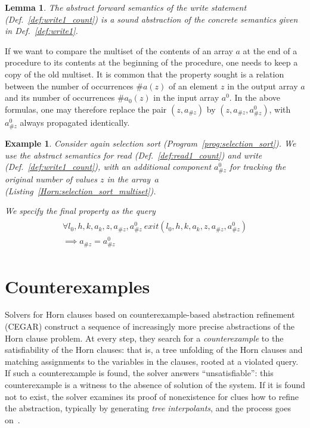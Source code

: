 \documentclass[a4paper]{article}
\newcommand{\hash}{\#}
\theoremstyle{definition}
\theoremstyle{plain}
\newtheorem{lemma}[theorem]{Lemma}
\newtheorem{example}{Example}
\begin{document}
\begin{lemma}
The abstract forward semantics of the write statement (Def.~\ref{def:write1_count}) is a sound abstraction of the concrete semantics given in Def.~\ref{def:write1}.
\end{lemma}

If we want to compare the multiset of the contents of an array $a$ at the end of a procedure to its contents at the beginning of the procedure, one needs to keep a copy of the old multiset.
It is common that the property sought is a relation between the number of occurrences $\hash a(z)$ of an element $z$ in the output array $a$ and its number of occurrences $\hash a_0(z)$ in the input array $a^0$. In the above formulas, one may therefore replace the pair $(z, a_{\hash z})$ by $(z, a_{\hash z}, a^0_{\hash z})$, with $a^0_{\hash z}$ always propagated identically.

\begin{example}\label{ex:selection_sort_multiset}
Consider again selection sort (Program~\ref{prog:selection_sort}). We use the abstract semantics for read (Def.~\ref{def:read1_count}) and write (Def.~\ref{def:write1_count}), with an additional component $a^0_{\hash z}$ for tracking the original number of values $z$ in the array~$a$ (Listing~\ref{Horn:selection_sort_multiset}).

We specify the final property as the query
\begin{align}
\begin{aligned}
\forall l_0,h,k,a_k,z,a_{\hash z},a^0_{\hash z}~
\mathit{exit}(l_0,h,k,a_k,z,a_{\hash z},a^0_{\hash z}) \\
\implies a_{\hash z} = a^0_{\hash z}
\end{aligned}
\end{align}
\end{example}

\section{Counterexamples}
\label{sec:counterexample}
Solvers for Horn clauses based on counterexample-based abstraction refinement (CEGAR) construct a sequence of increasingly more precise abstractions of the Horn clause problem. At every step, they search for a \emph{counterexample} to the satisfiability of the Horn clauses: that is, a tree unfolding of the Horn clauses and matching assignments to the variables in the clauses, rooted at a violated query. If such a counterexample is found, the solver answers ``unsatisfiable'': this counterexample is a witness to the absence of solution of the system. If it is found not to exist, the solver examines its proof of nonexistence for clues how to refine the abstraction, typically by generating \emph{tree interpolants}, and the process goes on~\cite{DBLP:conf/cav/RummerHK13}.
\end{document}
